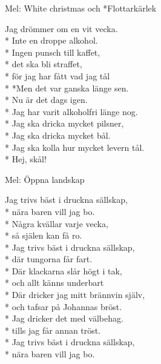 \begin{SongText}
    \begin{SongInfo}
        Mel: White christmas och *Flottarkärlek
    \end{SongInfo}
    \begin{SongVerse}
        Jag drömmer om en vit vecka.\\*%
        Inte en droppe alkohol.\\*%
        Ingen punsch till kaffet,\\*%
        det ska bli straffet,\\*%
        för jag har fått vad jag tål\\*%
        *Men det var ganska länge sen.\\*%
        Nu är det dags igen.\\*%
        Jag har varit alkoholfri länge nog.\\*%
        Jag ska dricka mycket pilsner,\\*%
        Jag ska dricka mycket bål.\\*%
        Jag ska kolla hur mycket levern tål.\\*%
        Hej, skål!
    \end{SongVerse}
\end{SongText}
\begin{SongText}
    \begin{SongInfo}
        Mel: Öppna landskap
    \end{SongInfo}
    \begin{SongVerse}
        Jag trivs bäst i druckna sällskap,\\*%
        nära baren vill jag bo.\\*%
        Några kvällar varje vecka,\\*%
        så själen kan få ro.\\*%
        Jag trivs bäst i druckna sällskap,\\*%
        där tungorna får fart.\\*%
        Där klackarna slår högt i tak,\\*%
        och allt känns underbart\\*%
        Där dricker jag mitt brännvin själv,\\*%
        och tafsar på Johannas bröst.\\*%
        Jag dricker det med välbehag.\\*%
        tills jag får annan tröst.\\*%
        Jag trivs bäst i druckna sällskap,\\*%
        nära baren vill jag bo. 
    \end{SongVerse}
\end{SongText}
